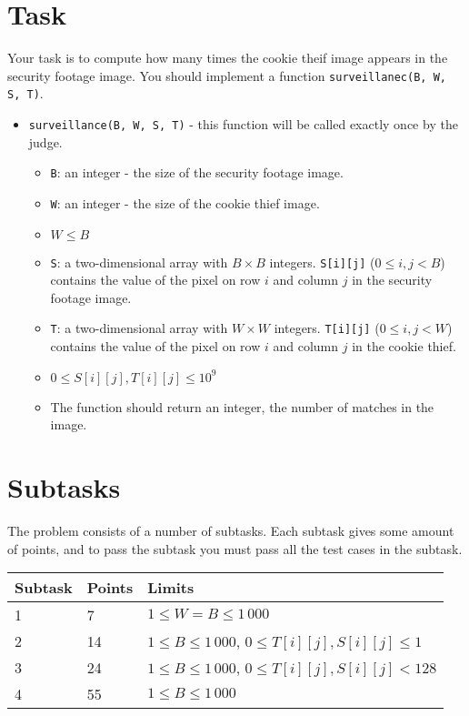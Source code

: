 \section*{Task}
Your task is to compute how many times the cookie theif image appears in the security footage image.
You should implement a function \texttt{surveillanec(B, W, S, T)}.
\begin{itemize}
  \item \texttt{surveillance(B, W, S, T)} - this function will be called exactly once by the judge.
  \begin{itemize}
    \item \texttt{B}: an integer - the size of the security footage image.
    \item \texttt{W}: an integer - the size of the cookie thief image.
    \item $W \le B$
    \item \texttt{S}: a two-dimensional array with $B \times B$ integers. \texttt{S[i][j]} ($0 \le i, j < B$) contains the value of the pixel on row $i$ and column $j$ in the security footage image.
    \item \texttt{T}: a two-dimensional array with $W \times W$ integers. \texttt{T[i][j]} ($0 \le i, j < W$) contains the value of the pixel on row $i$ and column $j$ in the cookie thief.
    \item $0 \le S[i][j], T[i][j] \le 10^9$
    \item The function should return an integer, the number of matches in the image.
  \end{itemize}
\end{itemize}

\section*{Subtasks}
The problem consists of a number of subtasks. Each subtask gives some amount of points, and to pass
the subtask you must pass all the test cases in the subtask.

\begin{tabular}{|l|l|l|}
  \hline
  \textbf{Subtask} & \textbf{Points} & \textbf{Limits} \\ \hline
  1 & 7 & $1 \le W = B \le 1\,000$  \\ \hline

  2 & 14 & $1 \le B \le 1\,000$, $0 \le T[i][j], S[i][j] \le 1$ \\ \hline

  3 & 24 & $1 \le B \le 1\,000$, $0 \le T[i][j], S[i][j] < 128$ \\ \hline

  4 & 55 & $1 \le B \le 1\,000$ \\ \hline

\end{tabular}

